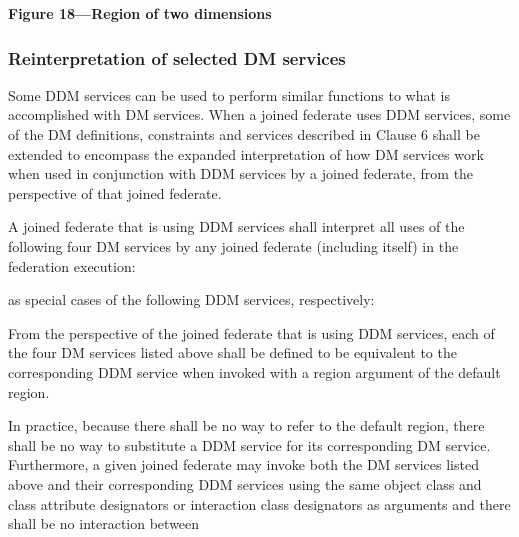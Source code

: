 \begin{compactstdpage}

    \vspace*{3pt}
    \begin{center}
        \hspace*{-1.7pt}
        \par\vspace{3.2pt}
        {\sffamily\bfseries\fontsize{9.0}{10.2}\selectfont Figure 18---Region of two dimensions}
    \end{center}

    \subsubsection{Reinterpretation of selected DM services}

    Some DDM services can be used to perform similar functions to what is accomplished with DM services. When a joined federate uses DDM services, some of the DM definitions, constraints and services described in Clause 6 shall be extended to encompass the expanded interpretation of how DM services work when used in conjunction with DDM services by a joined federate, from the perspective of that joined federate.

    A joined federate that is using DDM services shall interpret all uses of the following four DM services by any joined federate (including itself) in the federation execution:

    as special cases of the following DDM services, respectively:

    From the perspective of the joined federate that is using DDM services, each of the four DM services listed above shall be defined to be equivalent to the corresponding DDM service when invoked with a region argument of the default region.

    In practice, because there shall be no way to refer to the default region, there shall be no way to substitute a DDM service for its corresponding DM service. Furthermore, a given joined federate may invoke both the DM services listed above and their corresponding DDM services using the same object class and class attribute designators or interaction class designators as arguments and there shall be no interaction between


\end{compactstdpage}

